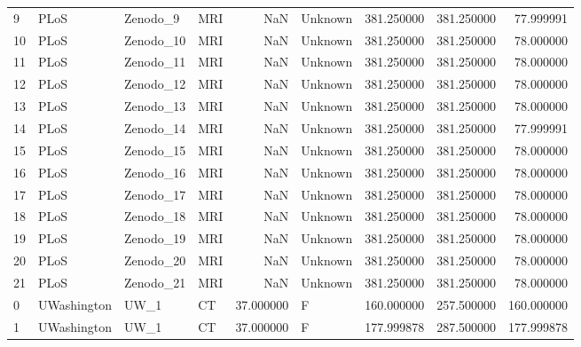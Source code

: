 \begin{tabular}{llllrlrrr}
9      &            PLoS &     Zenodo\_9 &                MRI &        NaN &  Unknown &       381.250000 &    381.250000 &   77.999991 \\
10     &            PLoS &    Zenodo\_10 &                MRI &        NaN &  Unknown &       381.250000 &    381.250000 &   78.000000 \\
11     &            PLoS &    Zenodo\_11 &                MRI &        NaN &  Unknown &       381.250000 &    381.250000 &   78.000000 \\
12     &            PLoS &    Zenodo\_12 &                MRI &        NaN &  Unknown &       381.250000 &    381.250000 &   78.000000 \\
13     &            PLoS &    Zenodo\_13 &                MRI &        NaN &  Unknown &       381.250000 &    381.250000 &   78.000000 \\
14     &            PLoS &    Zenodo\_14 &                MRI &        NaN &  Unknown &       381.250000 &    381.250000 &   77.999991 \\
15     &            PLoS &    Zenodo\_15 &                MRI &        NaN &  Unknown &       381.250000 &    381.250000 &   78.000000 \\
16     &            PLoS &    Zenodo\_16 &                MRI &        NaN &  Unknown &       381.250000 &    381.250000 &   78.000000 \\
17     &            PLoS &    Zenodo\_17 &                MRI &        NaN &  Unknown &       381.250000 &    381.250000 &   78.000000 \\
18     &            PLoS &    Zenodo\_18 &                MRI &        NaN &  Unknown &       381.250000 &    381.250000 &   78.000000 \\
19     &            PLoS &    Zenodo\_19 &                MRI &        NaN &  Unknown &       381.250000 &    381.250000 &   78.000000 \\
20     &            PLoS &    Zenodo\_20 &                MRI &        NaN &  Unknown &       381.250000 &    381.250000 &   78.000000 \\
21     &            PLoS &    Zenodo\_21 &                MRI &        NaN &  Unknown &       381.250000 &    381.250000 &   78.000000 \\
0      &     UWashington &         UW\_1 &                 CT &  37.000000 &        F &       160.000000 &    257.500000 &  160.000000 \\
1      &     UWashington &         UW\_1 &                 CT &  37.000000 &        F &       177.999878 &    287.500000 &  177.999878 \\

\end{tabular}
